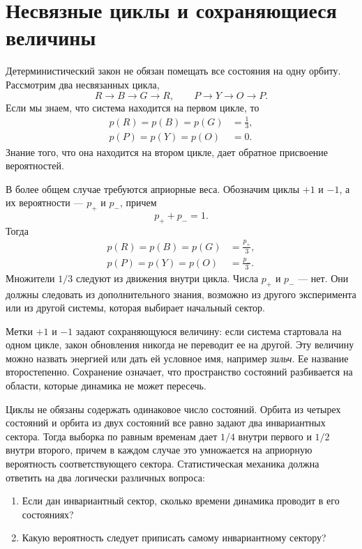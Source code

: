 \section{Несвязные циклы и сохраняющиеся величины}

Детерминистический закон не обязан помещать все состояния на одну орбиту. Рассмотрим два несвязанных цикла,
\begin{equation}
 R\longrightarrow B\longrightarrow G\longrightarrow R,
 \qquad
 P\longrightarrow Y\longrightarrow O\longrightarrow P.
 \label{eq:sm1-two-cycles}
\end{equation}
Если мы знаем, что система находится на первом цикле, то
\begin{equation}
 \begin{aligned}
 p(R)=p(B)=p(G)&=\frac13,\\
 p(P)=p(Y)=p(O)&=0.
 \end{aligned}
\end{equation}
Знание того, что она находится на втором цикле, дает обратное присвоение вероятностей.

В более общем случае требуются априорные веса. Обозначим циклы \(+1\) и \(-1\), а их вероятности — \(p_+\) и \(p_-\), причем
\begin{equation}
 p_++p_-=1.
\end{equation}
Тогда
\begin{align}
 p(R)=p(B)=p(G)&=\frac{p_+}{3},\\
 p(P)=p(Y)=p(O)&=\frac{p_-}{3}.
 \label{eq:sm1-sector-weights}
\end{align}
Множители \(1/3\) следуют из движения внутри цикла. Числа \(p_+\) и \(p_-\) — нет. Они должны следовать из дополнительного знания, возможно из другого эксперимента или из другой системы, которая выбирает начальный сектор.

Метки \(+1\) и \(-1\) задают сохраняющуюся величину: если система стартовала на одном цикле, закон обновления никогда не переводит ее на другой. Эту величину можно назвать энергией или дать ей условное имя, например \emph{зильч}. Ее название второстепенно. Сохранение означает, что пространство состояний разбивается на области, которые динамика не может пересечь.

Циклы не обязаны содержать одинаковое число состояний. Орбита из четырех состояний и орбита из двух состояний все равно задают два инвариантных сектора. Тогда выборка по равным временам дает \(1/4\) внутри первого и \(1/2\) внутри второго, причем в каждом случае это умножается на априорную вероятность соответствующего сектора. Статистическая механика должна ответить на два логически различных вопроса:
\begin{enumerate}
\item Если дан инвариантный сектор, сколько времени динамика проводит в его состояниях?
\item Какую вероятность следует приписать самому инвариантному сектору?
\end{enumerate}

